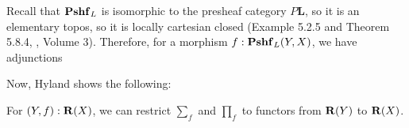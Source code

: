 Recall that $ \mathbf{Pshf}_{L} $ is isomorphic to the presheaf category $ P \mathbf L $, so it is an elementary topos, so it is locally cartesian closed (Example 5.2.5 and Theorem 5.8.4, \autocite{borceux}, Volume 3). Therefore, for a morphism $ f: \mathbf{Pshf}_{L}(Y, X) $, we have adjunctions
\begin{center}
\end{center}

Now, Hyland shows the following:
\begin{theorem}\label{thm:restrict-sum-product}
  For $ (Y, f) : \mathbf{R}(X) $, we can restrict $ \sum_f $ and $ \prod_f $ to functors from $ \mathbf{R}(Y) $ to $ \mathbf{R}(X) $.
\end{theorem}

